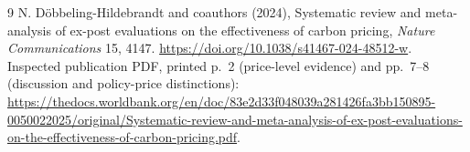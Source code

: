 \documentclass[11pt]{article}
\begin{document}
\begin{thebibliography}{9}
 N. D\"obbeling-Hildebrandt and coauthors (2024), Systematic
review and meta-analysis of ex-post evaluations on the effectiveness of
carbon pricing, \emph{Nature Communications} 15, 4147.
\url{https://doi.org/10.1038/s41467-024-48512-w}.
Inspected publication PDF, printed p.\ 2 (price-level evidence) and
pp.\ 7--8 (discussion and policy-price distinctions):
\url{https://thedocs.worldbank.org/en/doc/83e2d33f048039a281426fa3bb150895-0050022025/original/Systematic-review-and-meta-analysis-of-ex-post-evaluations-on-the-effectiveness-of-carbon-pricing.pdf}.
\end{thebibliography}
\end{document}
